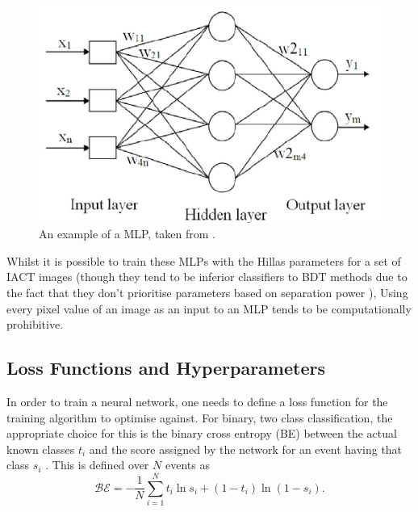 \begin{figure}[ht] 
        \centering \includegraphics[width=0.6\columnwidth]{figures/net.png}
        \caption{
                \label{fig:mlp} %
                An example of a MLP, taken from \cite{oil}.
        }
\end{figure}

Whilst it is possible to train these MLPs with the Hillas parameters for a set of IACT images (though they tend to be inferior classifiers to BDT methods due to the fact that they don't prioritise parameters based on separation power \cite{hessbdt}), 
Using every pixel value of an image as an input to an MLP tends to be computationally prohibitive.

\subsection{Loss Functions and Hyperparameters}
\label{MLdefs}
In order to train a neural network, one needs to define a loss function for the training algorithm to optimise against. For binary, two class classification, the appropriate choice for this is the  binary cross entropy (BE) between the actual known classes $t_i$ and the score assigned by the network for an event having that class $s_i$ \cite{Keras}. This is defined over $N$ events as
\begin{equation}
    \mathcal{BE}=-\frac{1}{N}\sum_{i=1}^{N}t_i\ln{s_i}+(1-t_i)\ln{(1-s_i)}.
\end{equation}

